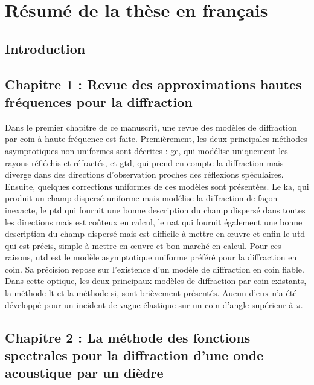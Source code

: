 \chapter[][Résumé de la thèse en français]{Résumé de la thèse en français}

\section[Résumé de la thèse en français]{Introduction}

\section[Résumé de la thèse en français]{Chapitre 1 : Revue des approximations hautes fréquences pour la diffraction}

Dans le premier chapitre de ce manuscrit, une revue des modèles de diffraction par coin à haute fréquence est faite. Premièrement, les deux principales méthodes asymptotiques non uniformes sont décrites : \acrfull{ge}, qui modélise uniquement les rayons réfléchis et réfractés, et \acrfull{gtd}, qui prend en compte la diffraction mais diverge dans des directions d'observation proches des réflexions spéculaires. Ensuite, quelques corrections uniformes de ces modèles sont présentées. Le \acrfull{ka}, qui produit un champ dispersé uniforme mais modélise la diffraction de façon inexacte, le \acrfull{ptd} qui fournit une bonne description du champ dispersé dans toutes les directions mais est coûteux en calcul, le \acrfull{uat} qui fournit également une bonne description du champ dispersé mais est difficile à mettre en œuvre et enfin le \acrfull{utd} qui est précis, simple à mettre en œuvre et bon marché en calcul. Pour ces raisons, \acrshort{utd} est le modèle asymptotique uniforme préféré pour la diffraction en coin. Sa précision repose sur l'existence d'un modèle de diffraction en coin fiable. Dans cette optique, les deux principaux modèles de diffraction par coin existants, la méthode \acrfull{lt} et la méthode \acrfull{si}, sont brièvement présentés. Aucun d'eux n'a été développé pour un incident de vague élastique sur un coin d'angle supérieur à $\pi$.

\section[Résumé de la thèse en français]{Chapitre 2 : La méthode des fonctions spectrales pour la diffraction d'une onde acoustique par un dièdre}

